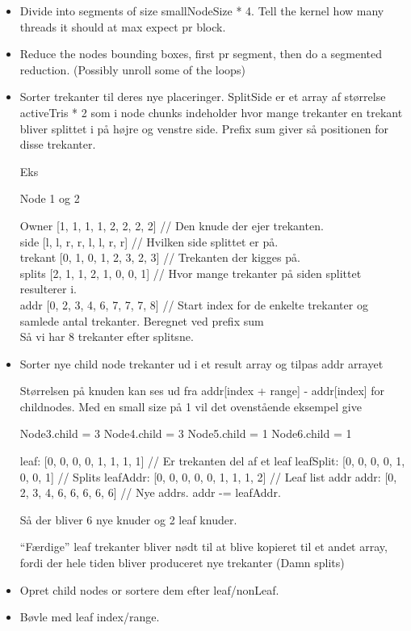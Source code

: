 \begin{itemize}
\item
Divide into segments of size smallNodeSize * 4. Tell the kernel how
many threads it should at max expect pr block.

\item
Reduce the nodes bounding boxes, first pr segment, then do a segmented
reduction. (Possibly unroll some of the loops)

\item
Sorter trekanter til deres nye placeringer. SplitSide er et array af
størrelse activeTris * 2 som i node chunks indeholder hvor mange
trekanter en trekant bliver splittet i på højre og venstre
side. Prefix sum giver så positionen for disse trekanter.

Eks

Node 1 og 2

Owner     [1, 1, 1, 1, 2, 2, 2, 2] // Den knude der ejer trekanten.\\
side      [l, l, r, r, l, l, r, r] // Hvilken side splittet er på.\\
trekant   [0, 1, 0, 1, 2, 3, 2, 3] // Trekanten der kigges på.\\
splits    [2, 1, 1, 2, 1, 0, 0, 1] // Hvor mange trekanter på siden splittet resulterer i.\\
addr      [0, 2, 3, 4, 6, 7, 7, 7, 8] // Start index for de enkelte trekanter og samlede antal trekanter. Beregnet ved prefix sum\\

Så vi har 8 trekanter efter splitsne.

\item
Sorter nye child node trekanter ud i et result array og tilpas addr arrayet

Størrelsen på knuden kan ses ud fra addr[index + range] - addr[index]
for childnodes. Med en small size på 1 vil det ovenstående eksempel give

Node3.child = 3
Node4.child = 3
Node5.child = 1
Node6.child = 1

leaf:      [0, 0, 0, 0, 1, 1, 1, 1] // Er trekanten del af et leaf
leafSplit: [0, 0, 0, 0, 1, 0, 0, 1] // Splits
leafAddr:  [0, 0, 0, 0, 0, 1, 1, 1, 2] // Leaf list addr
addr:      [0, 2, 3, 4, 6, 6, 6, 6, 6] // Nye addrs. addr -= leafAddr.

Så der bliver 6 nye knuder og 2 leaf knuder.

``Færdige'' leaf trekanter bliver nødt til at blive kopieret til et
andet array, fordi der hele tiden bliver produceret nye trekanter
(Damn splits)

\item
Opret child nodes or sortere dem efter leaf/nonLeaf.

\item
Bøvle med leaf index/range.

\end{itemize}

